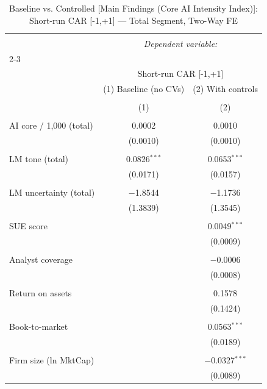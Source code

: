 
\begin{table}[!htbp] \centering 
  \caption{Baseline vs. Controlled [Main Findings (Core AI Intensity Index)]: Short-run CAR [-1,+1] — Total Segment, Two-Way FE} 
  \label{} 
\begin{tabular}{@{\extracolsep{5pt}}lcc} 
\\[-1.8ex]\hline 
\hline \\[-1.8ex] 
 & \multicolumn{2}{c}{\textit{Dependent variable:}} \\ 
\cline{2-3} 
\\[-1.8ex] & \multicolumn{2}{c}{Short-run CAR [-1,+1]} \\ 
 & (1) Baseline (no CVs) & (2) With controls \\ 
\\[-1.8ex] & (1) & (2)\\ 
\hline \\[-1.8ex] 
 AI core / 1,000 (total) & 0.0002 & 0.0010 \\ 
  & (0.0010) & (0.0010) \\ 
  & & \\ 
 LM tone (total) & 0.0826$^{***}$ & 0.0653$^{***}$ \\ 
  & (0.0171) & (0.0157) \\ 
  & & \\ 
 LM uncertainty (total) & $-$1.8544 & $-$1.1736 \\ 
  & (1.3839) & (1.3545) \\ 
  & & \\ 
 SUE score &  & 0.0049$^{***}$ \\ 
  &  & (0.0009) \\ 
  & & \\ 
 Analyst coverage &  & $-$0.0006 \\ 
  &  & (0.0008) \\ 
  & & \\ 
 Return on assets &  & 0.1578 \\ 
  &  & (0.1424) \\ 
  & & \\ 
 Book-to-market &  & 0.0563$^{***}$ \\ 
  &  & (0.0189) \\ 
  & & \\ 
 Firm size (ln MktCap) &  & $-$0.0327$^{***}$ \\ 
  &  & (0.0089) \\ 

\end{tabular}
\end{table}
